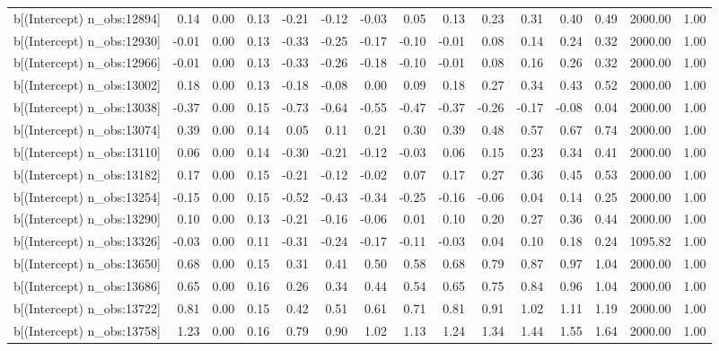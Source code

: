 \begin{table}[ht]
\begin{tabular}{rrrrrrrrrrrrrrr}
  b[(Intercept) n\_obs:12894] & 0.14 & 0.00 & 0.13 & -0.21 & -0.12 & -0.03 & 0.05 & 0.13 & 0.23 & 0.31 & 0.40 & 0.49 & 2000.00 & 1.00 \\ 
  b[(Intercept) n\_obs:12930] & -0.01 & 0.00 & 0.13 & -0.33 & -0.25 & -0.17 & -0.10 & -0.01 & 0.08 & 0.14 & 0.24 & 0.32 & 2000.00 & 1.00 \\ 
  b[(Intercept) n\_obs:12966] & -0.01 & 0.00 & 0.13 & -0.33 & -0.26 & -0.18 & -0.10 & -0.01 & 0.08 & 0.16 & 0.26 & 0.32 & 2000.00 & 1.00 \\ 
  b[(Intercept) n\_obs:13002] & 0.18 & 0.00 & 0.13 & -0.18 & -0.08 & 0.00 & 0.09 & 0.18 & 0.27 & 0.34 & 0.43 & 0.52 & 2000.00 & 1.00 \\ 
  b[(Intercept) n\_obs:13038] & -0.37 & 0.00 & 0.15 & -0.73 & -0.64 & -0.55 & -0.47 & -0.37 & -0.26 & -0.17 & -0.08 & 0.04 & 2000.00 & 1.00 \\ 
  b[(Intercept) n\_obs:13074] & 0.39 & 0.00 & 0.14 & 0.05 & 0.11 & 0.21 & 0.30 & 0.39 & 0.48 & 0.57 & 0.67 & 0.74 & 2000.00 & 1.00 \\ 
  b[(Intercept) n\_obs:13110] & 0.06 & 0.00 & 0.14 & -0.30 & -0.21 & -0.12 & -0.03 & 0.06 & 0.15 & 0.23 & 0.34 & 0.41 & 2000.00 & 1.00 \\ 
  b[(Intercept) n\_obs:13182] & 0.17 & 0.00 & 0.15 & -0.21 & -0.12 & -0.02 & 0.07 & 0.17 & 0.27 & 0.36 & 0.45 & 0.53 & 2000.00 & 1.00 \\ 
  b[(Intercept) n\_obs:13254] & -0.15 & 0.00 & 0.15 & -0.52 & -0.43 & -0.34 & -0.25 & -0.16 & -0.06 & 0.04 & 0.14 & 0.25 & 2000.00 & 1.00 \\ 
  b[(Intercept) n\_obs:13290] & 0.10 & 0.00 & 0.13 & -0.21 & -0.16 & -0.06 & 0.01 & 0.10 & 0.20 & 0.27 & 0.36 & 0.44 & 2000.00 & 1.00 \\ 
  b[(Intercept) n\_obs:13326] & -0.03 & 0.00 & 0.11 & -0.31 & -0.24 & -0.17 & -0.11 & -0.03 & 0.04 & 0.10 & 0.18 & 0.24 & 1095.82 & 1.00 \\ 
  b[(Intercept) n\_obs:13650] & 0.68 & 0.00 & 0.15 & 0.31 & 0.41 & 0.50 & 0.58 & 0.68 & 0.79 & 0.87 & 0.97 & 1.04 & 2000.00 & 1.00 \\ 
  b[(Intercept) n\_obs:13686] & 0.65 & 0.00 & 0.16 & 0.26 & 0.34 & 0.44 & 0.54 & 0.65 & 0.75 & 0.84 & 0.96 & 1.04 & 2000.00 & 1.00 \\ 
  b[(Intercept) n\_obs:13722] & 0.81 & 0.00 & 0.15 & 0.42 & 0.51 & 0.61 & 0.71 & 0.81 & 0.91 & 1.02 & 1.11 & 1.19 & 2000.00 & 1.00 \\ 
  b[(Intercept) n\_obs:13758] & 1.23 & 0.00 & 0.16 & 0.79 & 0.90 & 1.02 & 1.13 & 1.24 & 1.34 & 1.44 & 1.55 & 1.64 & 2000.00 & 1.00 \\ 

\end{tabular}
\end{table}
